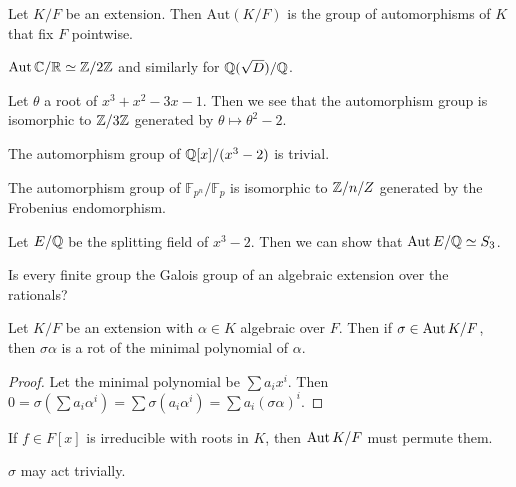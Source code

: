 \documentclass[10pt, twoside]{article}
\newcommand{\F}{\mathbb{F}}
\begin{document}
    \begin{defn}
        Let $K/F$ be an extension. Then $\mathrm{Aut}(K/F)$ is the group of automorphisms of $K$ that fix $F$ pointwise.
    \end{defn}

    \begin{exm}
        $\operatorname{Aut}{\mathbb{C}/\mathbb{R}} \simeq \mathbb{Z}/2\mathbb{Z}$ and similarly for $\mathbb{Q}(\sqrt{D})/\mathbb{Q}$.
    \end{exm}
    \begin{exm}
        Let $\theta$ a root of $x^3+x^2-3x-1$. Then we see that the automorphism group is isomorphic to $\mathbb{Z}/3\mathbb{Z}$ generated by $\theta \mapsto \theta^2 - 2$.
    \end{exm}
    \begin{exm}
        The automorphism group of $\mathbb{Q}[x]/(x^3-2)$ is trivial.
    \end{exm}
    \begin{exm}
        The automorphism group of $\F_{p^n}/\F_p$ is isomorphic to $\mathbb{Z}/n/Z$ generated by the Frobenius endomorphism.
    \end{exm}
    \begin{exm}
        Let $E/\mathbb{Q}$ be the splitting field of $x^3-2$. Then we can show that $\operatorname{Aut}{E/\mathbb{Q}} \simeq S_3$.
    \end{exm}
    \begin{quest}
        Is every finite group the Galois group of an algebraic extension over the rationals?
    \end{quest}

    \begin{prop}
        Let $K/F$ be an extension with $\alpha \in K$ algebraic over $F$. Then if $\sigma \in \operatorname{Aut}{K/F}$, then $\sigma \alpha$ is a rot of the minimal polynomial of $\alpha$.
        \begin{proof}
            Let the minimal polynomial be $\sum a_ix^i$. Then $0 = \sigma \left( \sum a_i\alpha^i \right) = \sum \sigma(a_i\alpha^i) = \sum a_i (\sigma \alpha)^i$.
        \end{proof}
    \end{prop}

    \begin{cor}
        If $f \in F[x]$ is irreducible with roots in $K$, then $\operatorname{Aut}{K/F}$ must permute them.
    \end{cor}

    \begin{rmk}
        $\sigma$ may act trivially.
    \end{rmk}
\end{document}
